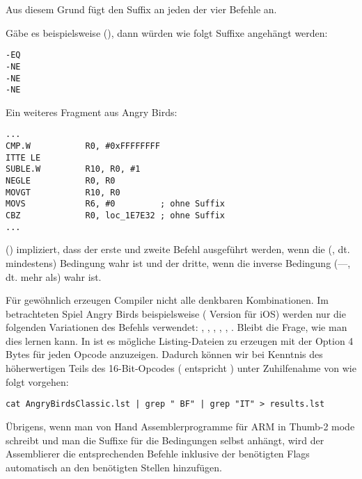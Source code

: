 Aus diesem Grund fügt \IDA den  Suffix an jeden der vier Befehle an.

Gäbe es beispielsweise  (), dann würden wie folgt Suffixe angehängt werden:

\begin{lstlisting}
-EQ
-NE
-NE
-NE
\end{lstlisting}

Ein weiteres Fragment aus Angry Birds:

\begin{lstlisting}[caption=Angry Birds Classic,style=customasmARM]
...
CMP.W           R0, #0xFFFFFFFF
ITTE LE
SUBLE.W         R10, R0, #1
NEGLE           R0, R0
MOVGT           R10, R0
MOVS            R6, #0         ; ohne Suffix
CBZ             R0, loc_1E7E32 ; ohne Suffix
...
\end{lstlisting}

 () impliziert, dass der erste und zweite Befehl ausgeführt werden, wenn die 
(, dt. mindestens) Bedingung wahr ist und der dritte, wenn die inverse Bedingung
(---, dt. mehr als) wahr ist.

Für gewöhnlich erzeugen Compiler nicht alle denkbaren Kombinationen.
Im betrachteten Spiel Angry Birds beispielsweise ( Version für iOS) werden nur die folgenden Variationen des
 Befehls verwendet:
, , , , , .
\myindex{\GrepUsage}
Bleibt die Frage, wie man dies lernen kann. 
In \IDA ist es mögliche Listing-Dateien zu erzeugen mit der Option 4 Bytes für jeden Opcode anzuzeigen. 
Dadurch können wir bei Kenntnis des höherwertigen Teils des 16-Bit-Opcodes ( entspricht ) unter
Zuhilfenahme von  wie folgt vorgehen:

\begin{lstlisting}
cat AngryBirdsClassic.lst | grep " BF" | grep "IT" > results.lst
\end{lstlisting}

Übrigens, wenn man von Hand Assemblerprogramme für ARM in Thumb-2 mode schreibt und man die Suffixe für die Bedingungen
selbst anhängt, wird der Assemblierer die entsprechenden  Befehle inklusive der benötigten Flags automatisch an
den benötigten Stellen hinzufügen.

\myparagraph{\NonOptimizingXcodeIV (\ARMMode)}

